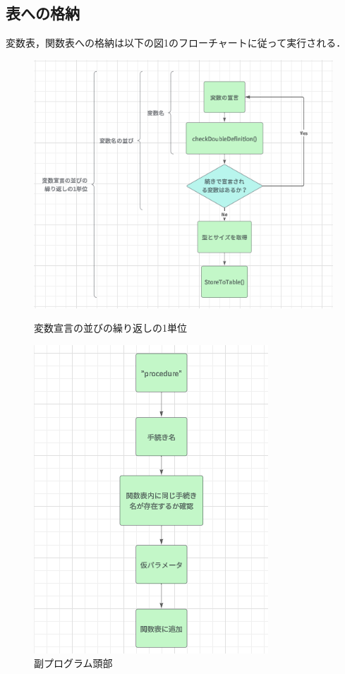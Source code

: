\documentclass[dvipdfmx]{jarticle}
\begin{document}
\subsection{表への格納}
変数表，関数表への格納は以下の図1のフローチャートに従って実行される．
\begin{figure}[h]
  \centering
  \begin{minipage}[b]{0.49\columnwidth}
      \centering
      \includegraphics[width=0.9\columnwidth]{hurotya.png}
      \caption{変数宣言の並びの繰り返しの1単位}
      \label{fig:a}
  \end{minipage}
  \begin{minipage}[b]{0.49\columnwidth}
      \centering
      \includegraphics[width=0.6\columnwidth]{hurotya1.png}
      \caption{副プログラム頭部}
      \label{fig:b}
  \end{minipage}
  \end{figure}
\end{document}
